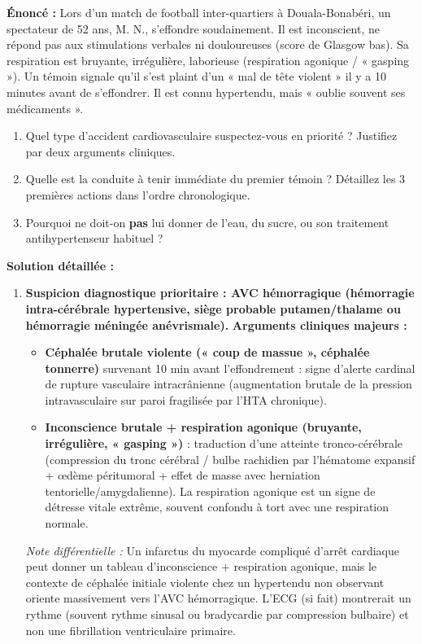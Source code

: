 \documentclass[11pt]{article}
\begin{document}
\begin{exoresolu}
\textbf{Énoncé :} Lors d'un match de football inter-quartiers à Douala-Bonabéri, un spectateur de 52 ans, M. N., s'effondre soudainement. Il est inconscient, ne répond pas aux stimulations verbales ni douloureuses (score de Glasgow bas). Sa respiration est bruyante, irrégulière, laborieuse (respiration agonique / « gasping »). Un témoin signale qu'il s'est plaint d'un « mal de tête violent » il y a 10 minutes avant de s'effondrer. Il est connu hypertendu, mais « oublie souvent ses médicaments ».
\begin{enumerate}
    \item Quel type d'accident cardiovasculaire suspectez-vous en priorité ? Justifiez par deux arguments cliniques.
    \item Quelle est la conduite à tenir immédiate du premier témoin ? Détaillez les 3 premières actions dans l'ordre chronologique.
    \item Pourquoi ne doit-on \textbf{pas} lui donner de l'eau, du sucre, ou son traitement antihypertenseur habituel ?
\end{enumerate}
\tcblower
\textbf{Solution détaillée :}
\begin{enumerate}
    \item \textbf{Suspicion diagnostique prioritaire : AVC hémorragique (hémorragie intra-cérébrale hypertensive, siège probable putamen/thalame ou hémorragie méningée anévrismale).}
        \textbf{Arguments cliniques majeurs :}
        \begin{itemize}
            \item \textbf{Céphalée brutale violente (« coup de massue », céphalée tonnerre)} survenant 10 min avant l'effondrement : signe d'alerte cardinal de rupture vasculaire intracrânienne (augmentation brutale de la pression intravasculaire sur paroi fragilisée par l'HTA chronique).
            \item \textbf{Inconscience brutale + respiration agonique (bruyante, irrégulière, « gasping »)} : traduction d'une atteinte tronco-cérébrale (compression du tronc cérébral / bulbe rachidien par l'hématome expansif + œdème péritumoral + effet de masse avec herniation tentorielle/amygdalienne). La respiration agonique est un signe de détresse vitale extrême, souvent confondu à tort avec une respiration normale.
        \end{itemize}
        \emph{Note différentielle :} Un infarctus du myocarde compliqué d'arrêt cardiaque peut donner un tableau d'inconscience + respiration agonique, mais le contexte de céphalée initiale violente chez un hypertendu non observant oriente massivement vers l'AVC hémorragique. L'ECG (si fait) montrerait un rythme (souvent rythme sinusal ou bradycardie par compression bulbaire) et non une fibrillation ventriculaire primaire.

\end{enumerate}
\end{exoresolu}
\end{document}
